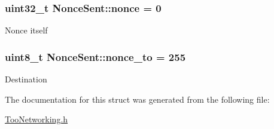 \subsubsection[{\texorpdfstring{nonce}{nonce}}]{\setlength{\rightskip}{0pt plus 5cm}uint32\+\_\+t Nonce\+Sent\+::nonce = 0}\hypertarget{structNonceSent_ae9d167a911c22c9d4490d2fee2093c10}{}\label{structNonceSent_ae9d167a911c22c9d4490d2fee2093c10}
Nonce itself 
\subsubsection[{\texorpdfstring{nonce\+\_\+to}{nonce_to}}]{\setlength{\rightskip}{0pt plus 5cm}uint8\+\_\+t Nonce\+Sent\+::nonce\+\_\+to = 255}\hypertarget{structNonceSent_ad5484888a11a0c041610c38b564c5627}{}\label{structNonceSent_ad5484888a11a0c041610c38b564c5627}
Destination 

The documentation for this struct was generated from the following file\+:\begin{DoxyCompactItemize}
\item 
\hyperlink{TooNetworking_8h}{Too\+Networking.\+h}\end{DoxyCompactItemize}

